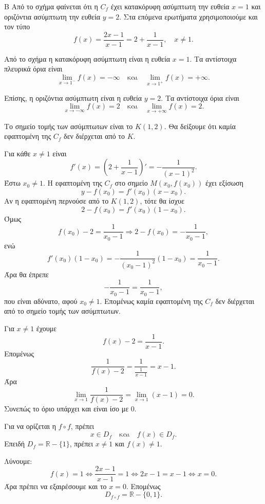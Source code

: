 

\begin{thema}{Β}
Από το σχήμα φαίνεται ότι η $C_f$ έχει κατακόρυφη ασύμπτωτη την ευθεία $x=1$ και οριζόντια ασύμπτωτη την ευθεία $y=2$. Στα επόμενα ερωτήματα χρησιμοποιούμε και τον τύπο
\[
f(x)=\frac{2x-1}{x-1}=2+\frac{1}{x-1},\quad x\neq 1.
\]

\begin{erwthma}
\item Από το σχήμα η κατακόρυφη ασύμπτωτη είναι η ευθεία $x=1$. Τα αντίστοιχα πλευρικά όρια είναι
\[
\lim_{x\to 1^-}f(x)=-\infty
\quad\text{και}\quad
\lim_{x\to 1^+}f(x)=+\infty.
\]

Επίσης, η οριζόντια ασύμπτωτη είναι η ευθεία $y=2$. Τα αντίστοιχα όρια είναι
\[
\lim_{x\to -\infty}f(x)=2
\quad\text{και}\quad
\lim_{x\to +\infty}f(x)=2.
\]

\item Το σημείο τομής των ασύμπτωτων είναι το $K(1,2)$. Θα δείξουμε ότι καμία εφαπτομένη της $C_f$ δεν διέρχεται από το $K$.

Για κάθε $x\neq 1$ είναι
\[
f'(x)=\left(2+\frac{1}{x-1}\right)'=-\frac{1}{(x-1)^2}.
\]
Έστω $x_0\neq 1$. Η εφαπτομένη της $C_f$ στο σημείο $M(x_0,f(x_0))$ έχει εξίσωση
\[
y-f(x_0)=f'(x_0)(x-x_0).
\]
Αν η εφαπτομένη περνούσε από το $K(1,2)$, τότε θα ίσχυε
\[
2-f(x_0)=f'(x_0)(1-x_0).
\]
Όμως
\[
f(x_0)-2=\frac{1}{x_0-1}\Rightarrow 2-f(x_0)=-\frac{1}{x_0-1},
\]
ενώ
\[
f'(x_0)(1-x_0)
=-\frac{1}{(x_0-1)^2}(1-x_0)
=\frac{1}{x_0-1}.
\]
Άρα θα έπρεπε
\[
-\frac{1}{x_0-1}=\frac{1}{x_0-1},
\]
που είναι αδύνατο, αφού $x_0\neq 1$. Επομένως καμία εφαπτομένη της $C_f$ δεν διέρχεται από το σημείο τομής των ασύμπτωτων.

\item Για $x\neq 1$ έχουμε
\[
f(x)-2=\frac{1}{x-1}.
\]
Επομένως
\[
\frac{1}{f(x)-2}=\frac{1}{\frac{1}{x-1}}=x-1.
\]
Άρα
\[
\lim_{x\to 1}\frac{1}{f(x)-2}
=\lim_{x\to 1}(x-1)=0.
\]
Συνεπώς το όριο υπάρχει και είναι ίσο με $0$.

\item Για να ορίζεται η $f\circ f$, πρέπει
\[
x\in D_f
\quad\text{και}\quad
f(x)\in D_f.
\]
Επειδή $D_f=\mathbb{R}-\{1\}$, πρέπει $x\neq 1$ και $f(x)\neq 1$.

Λύνουμε:
\[
f(x)=1
\Leftrightarrow
\frac{2x-1}{x-1}=1
\Leftrightarrow
2x-1=x-1
\Leftrightarrow
x=0.
\]
Άρα πρέπει να εξαιρέσουμε και το $x=0$. Επομένως
\[
D_{f\circ f}=\mathbb{R}-\{0,1\}.
\]
\end{erwthma}
\end{thema}

